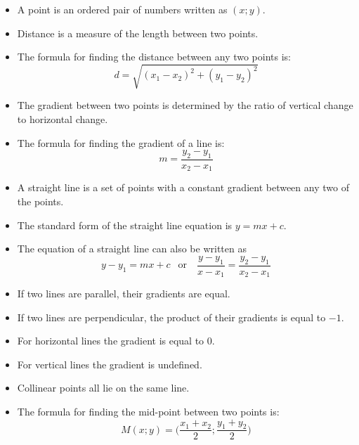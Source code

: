 \summary
\begin{itemize}[noitemsep]
\item A point is an ordered pair of numbers written as $(x;y)$.
\item Distance is a measure of the length between two points.
\item The formula for finding the distance between  any two points is: 
\begin{equation*}
d=\sqrt{{({x}_{1}-{x}_{2})}^{2}+{({y}_{1}-{y}_{2})}^{2}}
\end{equation*}
\item The gradient between two points is determined by the ratio of vertical change to horizontal change.

\item The formula for finding the gradient of a line is: 
\begin{equation*}
m=\frac{{y}_{2}-{y}_{1}}{{x}_{2}-{x}_{1}}
\end{equation*}
\item A straight line is a set of points with a constant gradient between any two of the
points.
\item The standard form of the straight line equation is $y=mx+c$.
\item The equation of a straight line can also be written as  
\begin{equation*}
y-y_1=mx+c ~~\mbox{  or  } ~~~\dfrac{y-y_1}{x-x_1}=\dfrac{y_2-y_1}{x_2-x_1}\end{equation*}
\item If two lines are parallel, their gradients are equal.
\item If two lines are perpendicular, the product of their gradients is equal to $-1$.
\item For horizontal lines the gradient is equal to $0$.
\item For vertical lines the gradient is undefined.
\item Collinear points all lie on the same line.
\item The formula for finding the mid-point between two points is: 
\begin{equation*}
M(x;y) = \Big(\frac{{x}_{1}+{x}_{2}}{2};\frac{{y}_{1}+{y}_{2}}{2}\Big)
\end{equation*}
\end{itemize}


